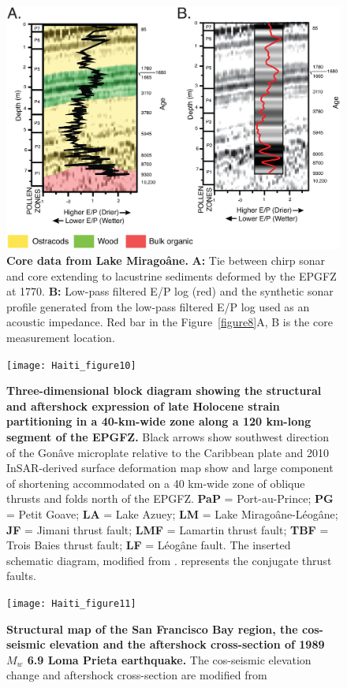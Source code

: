 \documentclass[linenumbers,draft]{agujournal}
\begin{document}
\begin{figure}
\centering
\includegraphics[width=\textwidth]{Haiti_figure9}
\caption{\textbf{Core data from Lake Mirago\^ane.} \textbf{A:} Tie between chirp sonar and core \citep{higuera199910} extending to lacustrine sediments deformed by the EPGFZ at 1770. \textbf{B:} Low-pass filtered E/P log (red) and the synthetic sonar profile generated from the low-pass filtered E/P log used as an acoustic impedance. Red bar in the Figure~\ref{figure8}A, B is the core measurement \citep{higuera199910} location.}
\label{figure9}
\end{figure}

\begin{figure}
\centering
\texttt{[image: Haiti\_figure10]}
\caption{\textbf{Three-dimensional block diagram showing the structural and aftershock expression of late Holocene strain partitioning in a 40-km-wide zone along a 120 km-long segment of the EPGFZ.} Black arrows show southwest direction of the Gon\^ave microplate relative to the Caribbean plate and 2010 InSAR-derived surface deformation map show and large component of shortening accommodated on a 40 km-wide zone of oblique thrusts and folds north of the EPGFZ. \textbf{PaP} = Port-au-Prince; \textbf{PG} = Petit Goave; \textbf{LA} = Lake Azuey; \textbf{LM} = Lake Mirago\^ane-L\'eog\^ane; \textbf{JF} = Jimani thrust fault; \textbf{LMF} = Lamartin thrust fault; \textbf{TBF} = Trois Baies thrust fault; \textbf{LF} = L\'eog\^ane fault. The inserted schematic diagram, modified from \citet{sibson2012reverse}. represents the conjugate thrust faults.}
\label{figure10}
\end{figure}

\begin{figure}
\centering
\texttt{[image: Haiti\_figure11]}
\caption{\textbf{Structural map of the San Francisco Bay region, the cos-seismic elevation and the aftershock cross-section of 1989 $M_w$ 6.9  Loma Prieta earthquake.} The cos-seismic elevation change and aftershock cross-section are modified from \citet{marshall1991faulting}}
\label{figure11}
\end{figure}
\end{document}
